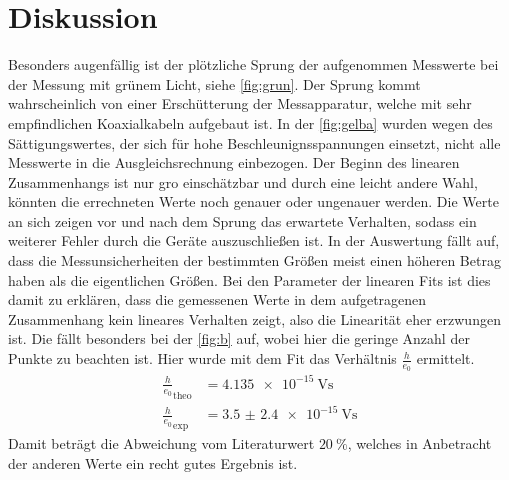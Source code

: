 \section{Diskussion}
\label{sec:Diskussion}
Besonders augenfällig ist der plötzliche Sprung der aufgenommen Messwerte bei der Messung mit grünem Licht, siehe \autoref{fig:grun}.
Der Sprung kommt wahrscheinlich von einer Erschütterung der Messapparatur, welche mit sehr empfindlichen Koaxialkabeln aufgebaut ist.
In der \autoref{fig:gelba} wurden wegen des Sättigungswertes, der sich für hohe Beschleunignsspannungen einsetzt, nicht alle Messwerte in die Ausgleichsrechnung einbezogen.
Der Beginn des linearen Zusammenhangs ist nur gro einschätzbar und durch eine leicht andere Wahl, könnten die errechneten Werte noch genauer oder ungenauer werden.
Die Werte an sich zeigen vor und nach dem Sprung das erwartete Verhalten, sodass ein weiterer Fehler durch die Geräte auszuschließen ist.
In der Auswertung fällt auf, dass die Messunsicherheiten der bestimmten Größen meist einen höheren Betrag haben als die eigentlichen Größen. 
Bei den Parameter der linearen Fits ist dies damit zu erklären, dass die gemessenen Werte in dem aufgetragenen Zusammenhang kein lineares Verhalten zeigt, also die Linearität eher erzwungen ist.
Die fällt besonders bei der \autoref{fig:b} auf, wobei hier die geringe Anzahl der Punkte zu beachten ist. 
Hier wurde mit dem Fit das Verhältnis $\frac{h}{e_0}$ ermittelt. 
\begin{align*}
    \frac{h}{e_0}_{\text{theo}} &= \SI{4.135e-15}{\volt\second}\\
    \frac{h}{e_0}_{\text{exp}} &= \SI{3.5(24)e-15}{\volt\second}
\end{align*} 
Damit beträgt die Abweichung vom Literaturwert $\SI{20}{\percent}$, welches in Anbetracht der anderen Werte ein recht gutes Ergebnis ist.

